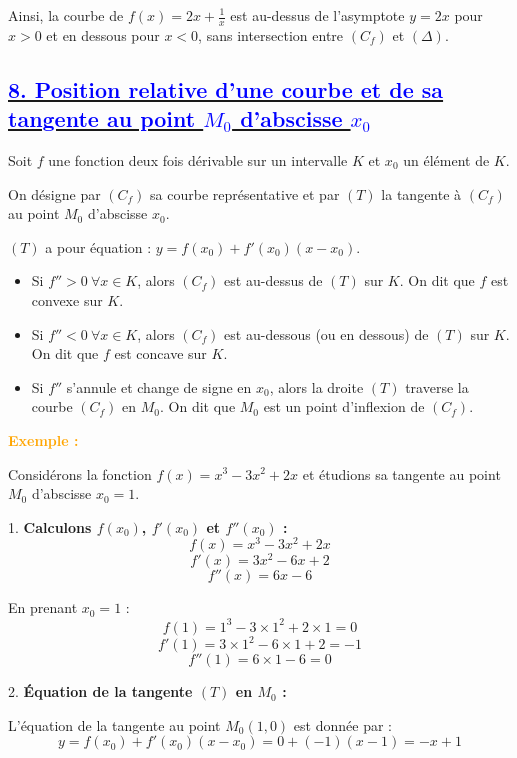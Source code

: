 \documentclass{article}
\newcounter{exemple}
\newcommand{\exemple}{%
  \refstepcounter{exemple}%
  \textbf{\textcolor{orange}{Exemple \theexemple : }} \ignorespaces
}
\begin{document}
Ainsi, la courbe de \( f(x) = 2x + \frac{1}{x} \) est au-dessus de l'asymptote \( y = 2x \) pour \( x > 0 \) et en dessous pour \( x < 0 \), sans intersection entre \( (C_f) \) et \( (\Delta) \).

\subsection*{\underline{\textbf{\textcolor{blue}{8. Position relative d’une courbe et de sa tangente au point \( M_{0} \)  d'abscisse \( x_{0} \)}}}}

Soit $f$ une fonction deux fois dérivable sur un intervalle $K$ et $x_0$ un élément de $K$. 

On désigne par $(C_f)$ sa courbe représentative et par $(T)$ la tangente à $(C_f)$ au point $M_0$ d’abscisse $x_0$.

$(T)$ a pour équation : $y = f(x_0) + f'(x_0)(x - x_0)$.

\begin{itemize}
    \item Si $f'' > 0 \ \forall x \in K$, alors $(C_f)$ est au-dessus de $(T)$ sur $K$. On dit que $f$ est convexe sur $K$.
    \item Si $f'' < 0 \ \forall x \in K$, alors $(C_f)$ est au-dessous (ou en dessous) de $(T)$ sur $K$. On dit que $f$ est concave sur $K$.
    \item Si $f''$ s'annule et change de signe en $x_0$, alors la droite $(T)$ traverse la courbe $(C_f)$ en $M_0$. On dit que $M_0$ est un point d’inflexion de $(C_f)$.
\end{itemize}

\textbf{\exemple}

Considérons la fonction \( f(x) = x^3 - 3x^2 + 2x \) et étudions sa tangente au point \( M_0 \) d'abscisse \( x_0 = 1 \).

1. \textbf{Calculons \( f(x_0) \), \( f'(x_0) \) et \( f''(x_0) \) :}
   \[
   f(x) = x^3 - 3x^2 + 2x
   \]
   \[
   f'(x) = 3x^2 - 6x + 2
   \]
   \[
   f''(x) = 6x - 6
   \]

   En prenant \( x_0 = 1 \) :
   \[
   f(1) = 1^3 - 3 \times 1^2 + 2 \times 1 = 0
   \]
   \[
   f'(1) = 3 \times 1^2 - 6 \times 1 + 2 = -1
   \]
   \[
   f''(1) = 6 \times 1 - 6 = 0
   \]

2. \textbf{Équation de la tangente \( (T) \) en \( M_0 \) :}

   L'équation de la tangente au point \( M_0(1, 0) \) est donnée par :
   \[
   y = f(x_0) + f'(x_0)(x - x_0) = 0 + (-1)(x - 1) = -x + 1
   \]
\end{document}
